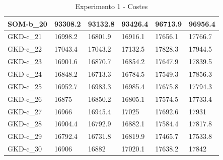 \documentclass[11pt,a4paper]{article}
\begin{document}
\begin{table}[H]
\begin{tabular}{l|l|l|l|l|l|}
			\multicolumn{1}{|l|}{SOM-b\_20} & 93308.2 & 93132.8 & 93426.4 & 96713.9 & 96956.4 \\ \hline
			\multicolumn{1}{|l|}{GKD-c\_21} & 16998.2 & 16801.9 & 16916.1 & 17656.1 & 17766.7 \\ \hline
			\multicolumn{1}{|l|}{GKD-c\_22} & 17043.4 & 17043.2 & 17132.5 & 17828.3 & 17944.5 \\ \hline
			\multicolumn{1}{|l|}{GKD-c\_23} & 16901.6 & 16870.7 & 16854.2 & 17647.9 & 17839.5 \\ \hline
			\multicolumn{1}{|l|}{GKD-c\_24} & 16848.2 & 16713.3 & 16784.5 & 17549.3 & 17856.3 \\ \hline
			\multicolumn{1}{|l|}{GKD-c\_25} & 16952.7 & 16983.3 & 16985.4 & 17675.8 & 17794.3 \\ \hline
			\multicolumn{1}{|l|}{GKD-c\_26} & 16875 & 16850.2 & 16805.1 & 17574.5 & 17733.4 \\ \hline
			\multicolumn{1}{|l|}{GKD-c\_27} & 16966 & 16945.4 & 17025 & 17692.6 & 17931 \\ \hline
			\multicolumn{1}{|l|}{GKD-c\_28} & 16904.4 & 16792.9 & 16882.1 & 17584.4 & 17817.8 \\ \hline
			\multicolumn{1}{|l|}{GKD-c\_29} & 16792.4 & 16731.8 & 16819.9 & 17465.7 & 17533.8 \\ \hline
			\multicolumn{1}{|l|}{GKD-c\_30} & 16906 & 16882 & 17020.1 & 17638.2 & 17842 \\ \hline
		\end{tabular}	
		\caption{ Experimento 1 - Costes }
		\label{311}
	\end{table}
	
\end{document}
